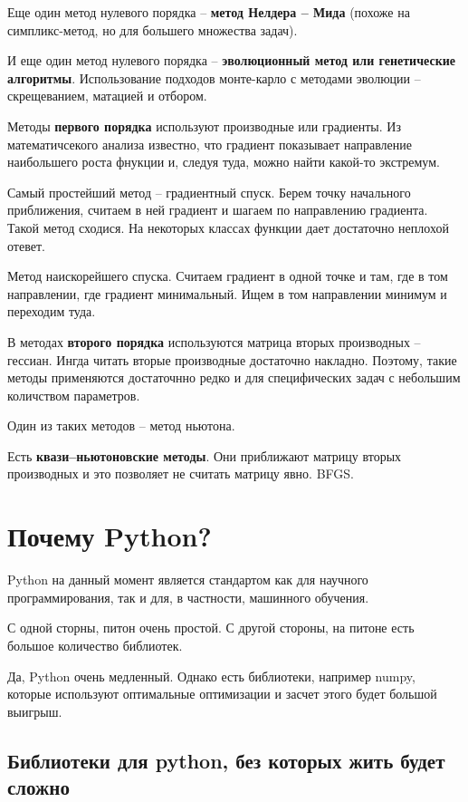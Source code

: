 Еще один метод нулевого порядка -- \textbf{метод Нелдера -- Мида} (похоже на симпликс-метод, но для большего множества задач).

И еще один метод нулевого порядка -- \textbf{эволюционный метод или генетические алгоритмы}.
Использование подходов монте-карло с методами эволюции -- скрещеванием, матацией и отбором.

Методы \textbf{первого порядка} используют производные или градиенты.
Из математичсекого анализа известно, что градиент показывает направление наибольшего роста фнукции и, следуя туда, можно найти какой-то экстремум.

Самый простейший метод -- градиентный спуск.
Берем точку начального приближения, считаем в ней градиент и шагаем по направлению градиента.
Такой метод сходися.
На некоторых классах функции дает достаточно неплохой отевет.

Метод наискорейшего спуска.
Считаем градиент в одной точке и там, где в том направлении, где градиент минимальный.
Ищем в том направлении минимум и переходим туда.

В методах \textbf{второго порядка} используются матрица вторых производных -- гессиан.
Ингда читать вторые производные достаточно накладно.
Поэтому,  такие методы применяются достаточнно редко и для специфических задач с небольшим количством параметров.

Один из таких методов -- метод ньютона.

Есть \textbf{квази--ньютоновские методы}.
Они приближают матрицу вторых производных и это позволяет не считать матрицу явно.
BFGS.


\section{Почему Python?}
Python на данный момент является стандартом как для научного программирования, так и для, в частности, машинного обучения.

С одной сторны, питон очень простой.
С другой стороны, на питоне есть большое количество библиотек.

Да, Python очень медленный.
Однако есть библиотеки, например numpy, которые используют оптимальные оптимизации и засчет этого будет большой выигрыш.

\subsection{Библиотеки для python, без которых жить будет сложно}

